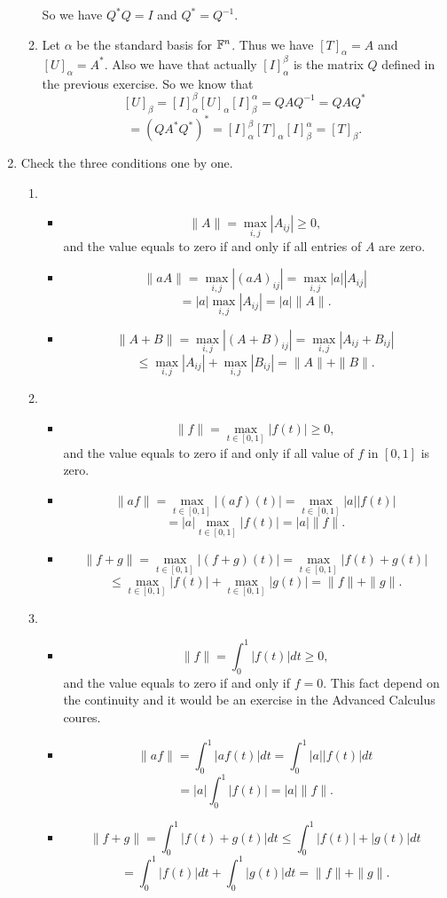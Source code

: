\begin{enumerate}
\begin{enumerate}
So we have $Q^*Q=I$ and $Q^*=Q^{-1}$.
\item Let $\alpha $ be the standard basis for $\mathbb{F}^n$. Thus we have $[T]_{\alpha}=A$ and $[U]_{\alpha}=A^*$. Also we have that actually $[I]_{\alpha}^{\beta}$ is the matrix $Q$ defined in the previous exercise. So we know that 
\[[U]_{\beta}=[I]_{\alpha}^{\beta}[U]_{\alpha}[I]_{\beta}^{\alpha}=QAQ^{-1}=QAQ^*\]
\[=(QA^*Q^*)^*=[I]_{\alpha}^{\beta}[T]_{\alpha}[I]_{\beta}^{\alpha}=[T]_{\beta}.\]
\end{enumerate}
\item Check the three conditions one by one.\begin{enumerate}
\item \begin{itemize}
\item \[\|A\|=\max_{i,j}|A_{ij}|\geq 0,\]
and the value equals to zero if and only if all entries of $A$ are zero.
\item \[\|aA\|=\max_{i,j}|(aA)_{ij}|=\max_{i,j}|a||A_{ij}|\]
\[=|a|\max_{i,j}|A_{ij}|=|a|\|A\|.\]
\item \[\|A+B\|=\max_{i,j}|(A+B)_{ij}|=\max_{i,j}|A_{ij}+B_{ij}|\]
\[\leq \max_{i,j}|A_{ij}|+\max_{i,j}|B_{ij}|=\|A\|+\|B\|.\]
\end{itemize}
\item \begin{itemize}
\item \[\|f\|=\max_{t\in [0,1]}|f(t)|\geq 0,\]
and the value equals to zero if and only if all value of $f$ in $[0,1]$ is zero.
\item \[\|af\|=\max_{t\in [0,1]}|(af)(t)|=\max_{t\in [0,1]}|a||f(t)|\]
\[=|a|\max_{t\in [0,1]}|f(t)|=|a|\|f\|.\]
\item \[\|f+g\|=\max_{t\in [0,1]}|(f+g)(t)|=\max_{t\in [0,1]}|f(t)+g(t)|\]
\[\leq \max_{t\in [0,1]}|f(t)|+\max_{t\in [0,1]}|g(t)|=\|f\|+\|g\|.\]
\end{itemize}
\item \begin{itemize}
\item \[\|f\|=\int_0^1{|f(t)|dt}\geq 0,\]
and the value equals to zero if and only if $f=0$. This fact depend on the continuity and it would be an exercise in the Advanced Calculus coures.
\item \[\|af\|=\int_0^1{|af(t)|dt}=\int_0^1{|a||f(t)|dt}\]
\[=|a|\int_0^1{|f(t)|}=|a|\|f\|.\]
\item \[\|f+g\|=\int_0^1{|f(t)+g(t)|dt}\leq\int_0^1{|f(t)|+|g(t)|dt}\]
\[=\int_0^1{|f(t)|dt}+\int_0^1{|g(t)|dt}=\|f\|+\|g\|.\]
\end{itemize}

\end{enumerate}
\end{enumerate}
